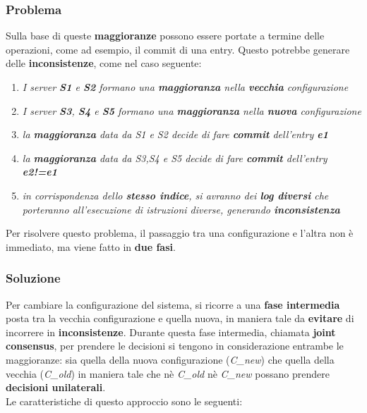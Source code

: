   \subsubsection{Problema}
    Sulla base di queste \textbf{maggioranze} possono essere portate a termine delle operazioni, come ad esempio, il commit  di una entry. Questo potrebbe generare delle \textbf{inconsistenze}, come nel caso seguente:
  \begin{enumerate}
    \item{\emph{I server \textbf{S1} e \textbf{S2} formano una \textbf{maggioranza} nella \textbf{vecchia} configurazione}}
    \item{\emph{I server \textbf{S3}, \textbf{S4} e \textbf{S5} formano una \textbf{maggioranza} nella \textbf{nuova} configurazione}}
    \item{\emph{la \textbf{maggioranza} data da S1 e S2 decide di fare \textbf{commit} dell'entry \textbf{e1}}}
    \item{\emph{la \textbf{maggioranza} data da S3,S4 e S5 decide di fare \textbf{commit} dell'entry \textbf{e2!=e1}}}
    \item{\emph{in corrispondenza dello \textbf{stesso indice}, si avranno dei \textbf{log diversi} che porteranno all'esecuzione di istruzioni diverse, generando \textbf{inconsistenza}}}
  \end{enumerate}

  Per risolvere questo problema, il passaggio tra una configurazione e l'altra non è immediato, ma viene fatto in \textbf{due fasi}.
    


  \subsubsection{Soluzione}   

    Per cambiare la configurazione del sistema, si ricorre a una \textbf{fase intermedia} posta tra la vecchia configurazione e quella nuova, in maniera tale da \textbf{evitare} di incorrere in \textbf{inconsistenze}.
    Durante questa fase intermedia, chiamata \textbf{joint consensus}, per prendere le decisioni si tengono in considerazione entrambe le maggioranze: sia quella della nuova configurazione (\textit{C\_new}) che quella della vecchia (\textit{C\_old}) in maniera tale che nè \textit{C\_old} nè \textit{C\_new} possano prendere \textbf{decisioni unilaterali}.\\

    Le caratteristiche di questo approccio sono le seguenti:
    
